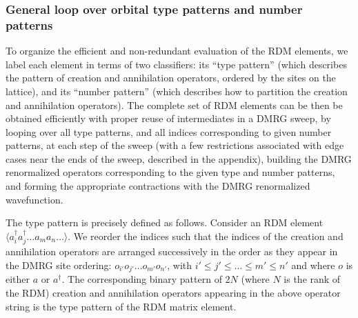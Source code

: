 \subsubsection{General loop over orbital type patterns and number patterns}

To organize the efficient and non-redundant evaluation of the RDM elements, we label each element in terms of two classifiers: its ``type pattern'' (which describes
the pattern of creation and annihilation operators, ordered by the sites on the lattice), and its ``number pattern'' (which describes how to partition the creation and annihilation operators). 
The complete set of RDM elements can be then be obtained efficiently with
proper reuse of intermediates in a DMRG sweep, by looping over all 
type patterns, and all indices corresponding to given number patterns, at each step of the sweep (with a few restrictions associated with edge cases near the ends of the sweep, described in the appendix), building the DMRG renormalized operators corresponding to the given type and number patterns, and forming
the appropriate contractions with the DMRG renormalized wavefunction. 

The type pattern is precisely defined as follows. Consider an RDM element $\langle {a}^\dagger_i{a}^\dagger_j\dots {a}_m{a}_n\dots \rangle$. 
We reorder the indices such that the indices of the creation and annihilation operators are arranged successively in the order as they appear
in the DMRG site ordering: ${o}_{i'}o_{j'}\dots o_{m'}o_{n'}$, with $i'\le j'\le \dots \le m' \le n'$ and where $o$ is either $a$ or $a^\dagger$.
The corresponding binary pattern of 2$N$ (where $N$ is the rank of the RDM) creation and annihilation operators appearing in the above operator string 
is the type pattern of the RDM matrix element.

